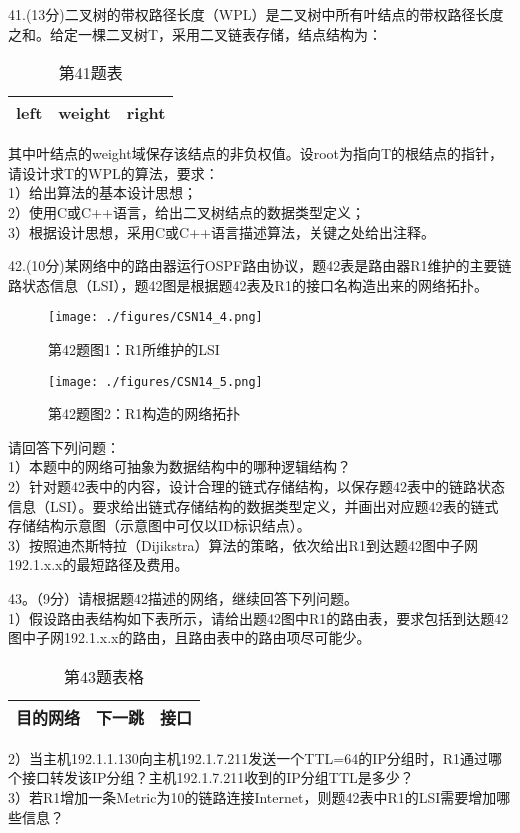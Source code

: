 41.(13分)二叉树的带权路径长度（WPL）是二叉树中所有叶结点的带权路径长度之和。给定一棵二叉树T，采用二叉链表存储，结点结构为：
\begin{table}[ht]
\centering
\caption{第41题表}\label{CSN14_tab1}
\begin{tabular}{|c|c|c|}
\hline
left & weight & right \\
\hline
\end{tabular}
\end{table}
其中叶结点的weight域保存该结点的非负权值。设root为指向T的根结点的指针，请设计求T的WPL的算法，要求： \\
1）给出算法的基本设计思想； \\
2）使用C或C++语言，给出二叉树结点的数据类型定义； \\
3）根据设计思想，采用C或C++语言描述算法，关键之处给出注释。

42.(10分)某网络中的路由器运行OSPF路由协议，题42表是路由器R1维护的主要链路状态信息（LSI），题42图是根据题42表及R1的接口名构造出来的网络拓扑。
\begin{figure}[ht]
\centering
\texttt{[image: ./figures/CSN14\_4.png]}
\caption{第42题图1：R1所维护的LSI} \label{CSN14_fig4}
\end{figure}

\begin{figure}[ht]
\centering
\texttt{[image: ./figures/CSN14\_5.png]}
\caption{第42题图2：R1构造的网络拓扑} \label{CSN14_fig5}
\end{figure}
请回答下列问题： \\
1）本题中的网络可抽象为数据结构中的哪种逻辑结构？ \\
2）针对题42表中的内容，设计合理的链式存储结构，以保存题42表中的链路状态信息（LSI）。要求给出链式存储结构的数据类型定义，并画出对应题42表的链式存储结构示意图（示意图中可仅以ID标识结点）。 \\
3）按照迪杰斯特拉（Dijikstra）算法的策略，依次给出R1到达题42图中子网192.1.x.x的最短路径及费用。

43。（9分）请根据题42描述的网络，继续回答下列问题。 \\
1）假设路由表结构如下表所示，请给出题42图中R1的路由表，要求包括到达题42图中子网192.1.x.x的路由，且路由表中的路由项尽可能少。 \\
\begin{table}[ht]
\centering
\caption{第43题表格}\label{CSN14_tab2}
\begin{tabular}{|c|c|c|}
\hline
目的网络 & 下一跳 & 接口 \\
\hline
\end{tabular}
\end{table}
2）当主机192.1.1.130向主机192.1.7.211发送一个TTL=64的IP分组时，R1通过哪个接口转发该IP分组？主机192.1.7.211收到的IP分组TTL是多少？ \\
3）若R1增加一条Metric为10的链路连接Internet，则题42表中R1的LSI需要增加哪些信息？

